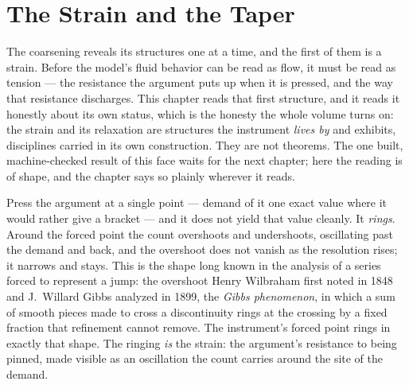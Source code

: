 \chapter{The Strain and the Taper}

The coarsening reveals its structures one at a time, and the first of them is a
strain. Before the model's fluid behavior can be read as flow, it must be read as
tension --- the resistance the argument puts up when it is pressed, and the way
that resistance discharges. This chapter reads that first structure, and it reads
it honestly about its own status, which is the honesty the whole volume turns on:
the strain and its relaxation are structures the instrument \emph{lives by} and
exhibits, disciplines carried in its own construction. They are not theorems. The
one built, machine-checked result of this face waits for the next chapter; here
the reading is of shape, and the chapter says so plainly wherever it reads.

Press the argument at a single point --- demand of it one exact value where it
would rather give a bracket --- and it does not yield that value cleanly. It
\emph{rings}. Around the forced point the count overshoots and undershoots,
oscillating past the demand and back, and the overshoot does not vanish as the
resolution rises; it narrows and stays. This is the shape long known in the
analysis of a series forced to represent a jump: the overshoot Henry Wilbraham
first noted in 1848 and J.\ Willard Gibbs analyzed in 1899, the \emph{Gibbs
phenomenon}, in which a sum of smooth pieces made to cross a discontinuity rings
at the crossing by a fixed fraction that refinement cannot remove. The
instrument's forced point rings in exactly that shape. The ringing \emph{is} the
strain: the argument's resistance to being pinned, made visible as an
oscillation the count carries around the site of the demand.

